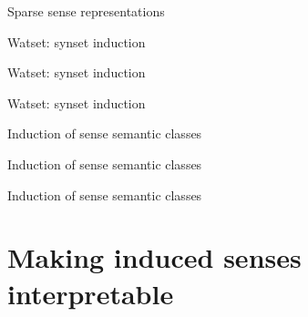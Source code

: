 \documentclass[usenames,dvipsnames]{beamer}
\begin{document}
\begin{frame}{Sparse sense representations}
	
\end{frame}

\begin{frame}{Watset: synset induction}
	
\end{frame}


\begin{frame}{Watset: synset induction}
	
\end{frame}


\begin{frame}{Watset: synset induction}
	
\end{frame}


\begin{frame}{Induction of sense semantic classes}
	
\end{frame}

\begin{frame}{Induction of sense semantic classes}
	
\end{frame}

\begin{frame}{Induction of sense semantic classes}
	
\end{frame}

\section{Making induced senses interpretable}
\end{document}

